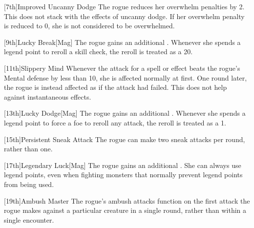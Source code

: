         [7th]{Improved Uncanny Dodge}
        The rogue reduces her overwhelm penalties by 2.
        This does not stack with the effects of uncanny dodge.
        If her overwhelm penalty is reduced to 0, she is not considered to be overwhelmed.

        [9th]{Lucky Break}[Mag]
        The rogue gains an additional .
        Whenever she spends a legend point to reroll a skill check, the reroll is treated as a 20.

        [11th]{Slippery Mind}
        Whenever the attack for a  spell or effect beats the rogue's Mental defense by less than 10, she is affected normally at first.
        One round later, the rogue is instead affected as if the attack had failed.
        This does not help against instantaneous effects.

        [13th]{Lucky Dodge}[Mag]
        The rogue gains an additional .
        Whenever she spends a legend point to force a foe to reroll any attack, the reroll is treated as a 1.

        [15th]{Persistent Sneak Attack}
        The rogue can make two sneak attacks per round, rather than one.

        [17th]{Legendary Luck}[Mag]
        The rogue gains an additional .
        She can always use legend points, even when fighting monsters that normally prevent legend points from being used.

        [19th]{Ambush Master}
        The rogue's ambush attacks function on the first attack the rogue makes against a particular creature in a single round, rather than within a single encounter.

